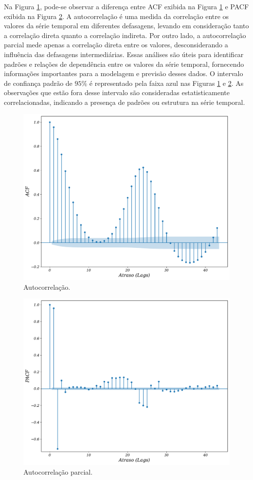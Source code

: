  Na Figura \ref{fig:acfa}, pode-se observar a diferença entre ACF exibida na Figura \ref{fig:acfa} e PACF exibida na Figura \ref{fig:pacf}. A autocorrelação é uma medida da correlação entre os valores da série temporal em diferentes defasagens, levando em consideração tanto a correlação direta quanto a correlação indireta. Por outro lado, a autocorrelação parcial mede apenas a correlação direta entre os valores, desconsiderando a influência das defasagens intermediárias. Essas análises são úteis para identificar padrões e relações de dependência entre os valores da série temporal, fornecendo informações importantes para a modelagem e previsão desses dados. O intervalo de confiança padrão de $95\%$ é representado pela faixa azul nas Figuras \ref{fig:acfa} e \ref{fig:pacf}. As observações que estão fora desse intervalo são consideradas estatisticamente correlacionadas, indicando a presença de padrões ou estrutura na série temporal.
 

 
 \begin{figure}[!htb]
 	\centering
 	\caption{Autocorrelação.}\label{fig:acfa}	\includegraphics[width=0.6\linewidth]{Resultados/Figuras/acf} 
 \end{figure}
 
 \begin{figure}[!htb]
 	\centering
 	\caption{Autocorrelação parcial.}\label{fig:pacf}	\includegraphics[width=0.6\linewidth]{Resultados/Figuras/pacf}
 \end{figure}
 
